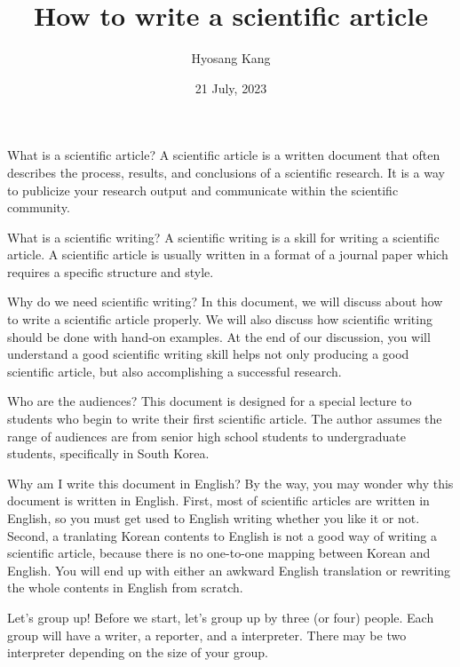 \documentclass{beamer}
\title{How to write a scientific article}
\author{Hyosang Kang}
\date{21 July, 2023}
\institute{Jeonbuk Science High School}
\begin{document}
\begin{frame}
\titlepage
\end{frame}

\begin{frame}{What is a scientific article?}
A scientific article is a written document that often describes the process, results, and conclusions of a scientific research. 
It is a way to publicize your research output and communicate within the scientific community. 
\end{frame}

\begin{frame}{What is a scientific writing?}
A scientific writing is a skill for writing a scientific article.
A scientific article is usually written in a format of a journal paper which requires a specific structure and style.
\end{frame}

\begin{frame}{Why do we need scientific writing?}
In this document, we will discuss about how to write a scientific article properly.
We will also discuss how scientific writing should be done with hand-on examples.
At the end of our discussion, you will understand a good scientific writing skill helps not only producing a good scientific article, but also accomplishing a successful research. 
\end{frame}

\begin{frame}{Who are the audiences?}
This document is designed for a special lecture to students who begin to write their first scientific article.
The author assumes the range of audiences are from senior high school students to undergraduate students, specifically in South Korea.
\end{frame}

\begin{frame}{Why am I write this document in English?}
By the way, you may wonder why this document is written in English.
First, most of scientific articles are written in English, so you must get used to English writing whether you like it or not.
Second, a tranlating Korean contents to English is not a good way of writing a scientific article, because there is no one-to-one mapping between Korean and English. You will end up with either an awkward English translation or rewriting the whole contents in English from scratch.
\end{frame}

\begin{frame}{Let's group up!}
Before we start, let's group up by three (or four) people.
Each group will have a writer, a reporter, and a interpreter.
There may be two interpreter depending on the size of your group.
\end{frame}
\end{document}
